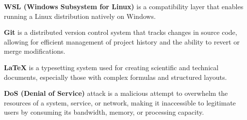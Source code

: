 \documentclass[twocolumn]{article}
\begin{document}
\label{def:wsl}
\noindent \textbf{WSL (Windows Subsystem for Linux)} is a compatibility layer that enables running a Linux distribution natively on Windows.


\label{def:git}
\noindent \textbf{Git} is a distributed version control system that tracks changes in source code, allowing for efficient management of project history and the ability to revert or merge modifications.




\label{def:latex}
\noindent \textbf{LaTeX} is a typesetting system used for creating scientific and technical documents, especially those with complex formulas and structured layouts.

\label{def:DoS}
\noindent \textbf{DoS (Denial of Service)} attack is a malicious attempt to overwhelm the resources of a system, service, or network, making it inaccessible to legitimate users by consuming its bandwidth, memory, or processing capacity.

\label{def:DoS}

\newpage


\end{document}
